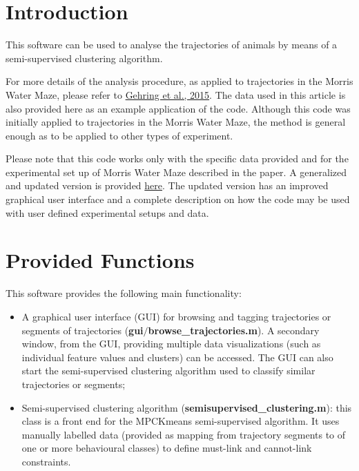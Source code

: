 \documentclass[12pt,titlepage]{article}
\begin{document}
\begin{doublespace}
\section{Introduction}

\indent This software can be used to analyse the trajectories of animals by means of a semi-supervised clustering algorithm.

For more details of the analysis procedure, as applied to trajectories in the Morris Water Maze, please refer to \href{http://www.nature.com/articles/srep14562}{Gehring et al., 2015}. The data used in this article is also provided here as an example application of the code. Although this code was initially applied to trajectories in the Morris Water Maze, the method is general enough as to be applied to other types of experiment.

Please note that this code works only with the specific data provided and for the experimental set up of Morris Water Maze described in the paper. A generalized and updated version is provided \href{https://github.com/RodentDataAnalytics/roda}{here}. The updated version has an improved graphical user interface and a complete description on how the code may be used with user defined experimental setups and data.


\section{Provided Functions}

This software provides the following main functionality:
\begin{itemize}
	\item A graphical user interface (GUI) for browsing and tagging trajectories or segments of trajectories (\textbf{gui$/$browse\_trajectories.m}). A secondary window, from the GUI, providing multiple data visualizations (such as individual feature values and clusters) can be accessed. The GUI can also start the semi-supervised clustering algorithm used to classify similar trajectories or segments;
	
	\item Semi-supervised clustering algorithm (\textbf{semisupervised\_clustering.m}): this class is a front end for the MPCKmeans semi-supervised algorithm. It uses manually labelled data (provided as mapping from trajectory segments to of one or more behavioural classes) to define must-link and cannot-link constraints.
	

\end{itemize}
\end{doublespace}
\end{document}
